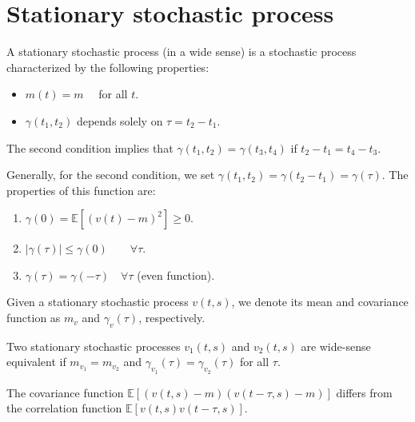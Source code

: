 \section{Stationary stochastic process}

\begin{definition}
    A stationary stochastic process (in a wide sense) is a stochastic process characterized by the following properties:
    \begin{itemize}
        \item $m(t)=m\quad$ for all $t$. 
        \item $\gamma(t_1,t_2)$ depends solely on $\tau=t_2-t_1$.
    \end{itemize}
\end{definition}
The second condition implies that $\gamma(t_1,t_2)=\gamma(t_3,t_4)$ if $t_2-t_1=t_4-t_3$. 

Generally, for the second condition, we set $\gamma(t_1,t_2)=\gamma(t_2-t_1)=\gamma(\tau)$. 
The properties of this function are:
\begin{enumerate}
    \item $\gamma(0)=\mathbb{E}\left[\left(v(t)-m\right)^2\right]\geq 0$.
    \item $\left\lvert \gamma(\tau) \right\rvert \leq \gamma(0) \qquad \forall\tau$.
    \item $\gamma(\tau)=\gamma(-\tau) \quad\forall\tau$ (even function). 
\end{enumerate}

\begin{property}
    Given a stationary stochastic process $v(t,s)$, we denote its mean and covariance function as $m_v$ and $\gamma_v(\tau)$, respectively.
\end{property}
\begin{property}
    Two stationary stochastic processes $v_1(t,s)$ and $v_2(t,s)$ are wide-sense equivalent if $m_{v_1}=m_{v_2}$ and $\gamma_{v_1}(\tau)=\gamma_{v_2}(\tau)$ for all $\tau$.
\end{property}
\begin{property}
    The covariance function $\mathbb{E}\left[ \left(v(t,s)-m\right)\left(v(t-\tau,s)-m\right) \right]$ differs from the correlation function $\mathbb{E}\left[ v(t,s)v(t-\tau,s) \right]$.
\end{property}

